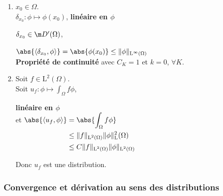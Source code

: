 \documentclass[12pt,a4paper]{article}
\begin{document}
	\begin{ex} 
		\begin{minipage}[t]{20cm}
			
			\vspace{-.2cm}
			
			\begin{enumerate}
			\item $x_0 \in \Omega$.\\
			$\delta_{x_0} : \phi \mapsto \phi(x_0)$, \textbf{linéaire en $\phi$}
			
			$\delta_{x_0} \in \m D'(\Omega)$, \begin{minipage}[t]{15cm}
				$\abs{\left<\delta_{x_0}, \phi\right>} =  \abs{\phi(x_0)} \leq \|\phi\|_{\text{L}^\infty(\Omega)}$\\
				\textbf{Propriété de continuité} avec $C_K = 1$ et $k = 0$, $\forall K$.
				\end{minipage}
				
				\vspace{.5cm}
				
			\item Soit $f \in \text{L}^2(\Omega)$.\\
			Soit $u_f : \phi \mapsto \displaystyle\int_\Omega f\phi$, \begin{minipage}[t]{12cm}
				\textbf{linéaire en $\phi$}\\
				et $\begin{aligned}[t]
					\abs{\left<u_f, \phi\right>} 
					&= \abs{\int_\Omega f \phi} \\
					&\leq \|f\|_{\text{L}^2(\Omega)}\|\phi\|_\text{L}^2(\Omega) \\
					&\leq C\|f\|_{\text{L}^2(\Omega)}\|\phi\|_{\text{L}^2(\Omega)}
				\end{aligned}$
			\end{minipage}
			
			Donc $u_f$ est une distribution.
			
		\end{enumerate}
		\end{minipage}
	\end{ex}
	
	
	\newpage
	
	\subsubsection{Convergence et dérivation au sens des distributions}
	
\end{document}
